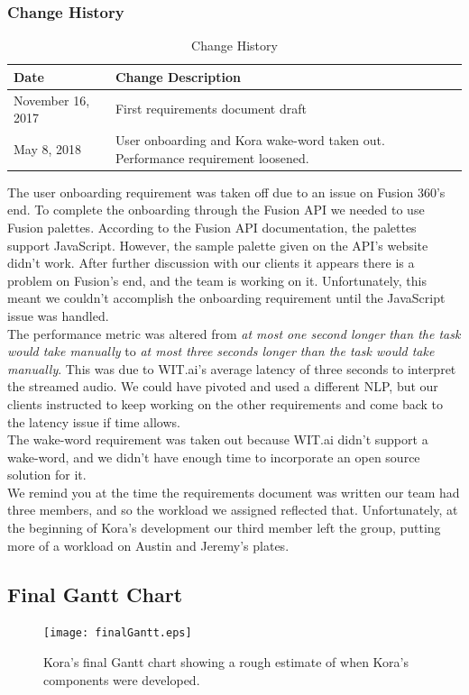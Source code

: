 \documentclass[onecolumn, draftclsnofoot,10pt, compsoc]{IEEEtran}
\newcommand{\newpara}{\\[0.1in]}
\begin{document}
		\subsubsection{Change History}
		\begin{table}[H]
			\centering
			\caption{Change History}
			\label{my-label}
			\begin{tabular}{|l|l|}
				\hline
				\textbf{Date}     & \textbf{Change Description}   \\ \hline
				November 16, 2017 & {First requirements document draft} \\ \hline
				May 8, 2018 & {User onboarding and Kora wake-word taken out. Performance requirement loosened.} \\ \hline
			\end{tabular}
		\end{table}
		
		The user onboarding requirement was taken off due to an issue on Fusion 360's end.
		To complete the onboarding through the Fusion API we needed to use Fusion palettes.
		According to the Fusion API documentation, the palettes support JavaScript. However, the sample palette given on the API's website didn't work.
		After further discussion with our clients it appears there is a problem on Fusion's end, and the team is working on it. 
		Unfortunately, this meant we couldn't accomplish the onboarding requirement until the JavaScript issue was handled.
		\newpara
		The performance metric was altered from \textit{at most one second longer than the task would take manually} to \textit{at most three seconds longer than the task would take manually}.
		This was due to WIT.ai's average latency of three seconds to interpret the streamed audio.
		We could have pivoted and used a different NLP, but our clients instructed to keep working on the other requirements and come back to the latency issue if time allows.
		\newpara
		The wake-word requirement was taken out because WIT.ai didn't support a wake-word, and we didn't have enough time to incorporate an open source solution for it. 
		\newpara
		We remind you at the time the requirements document was written our team had three members, and so the workload we assigned reflected that. Unfortunately, at the beginning of Kora's development our third member left the group, putting more of a workload on Austin and Jeremy's plates.
		
	\subsection{Final Gantt Chart}
		\begin{figure}[H]
			\texttt{[image: finalGantt.eps]}
			\centering
			\caption{Kora's final Gantt chart showing a rough estimate of when Kora's components were developed.}
		\end{figure}
\end{document}
